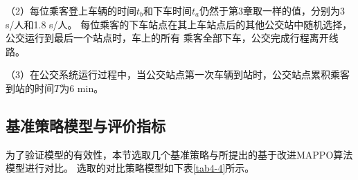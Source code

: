 （2）每位乘客登上车辆的时间$t_b$和下车时间$t_a$仍然于第3章取一样的值，分别为3 s/人和1.8 s/人。
每位乘客的下车站点在其上车站点后的其他公交站中随机选择，公交运行到最后一个站点时，车上的所有
乘客全部下车，公交完成行程离开线路。

（3）在公交系统运行过程中，当公交站点第一次车辆到站时，公交站点累积乘客到站的时间$T$为6 min。

\subsection{基准策略模型与评价指标}
为了验证模型的有效性，本节选取几个基准策略与所提出的基于改进MAPPO算法模型进行对比。
选取的对比策略模型如下表\ref{tab4-4}所示。







